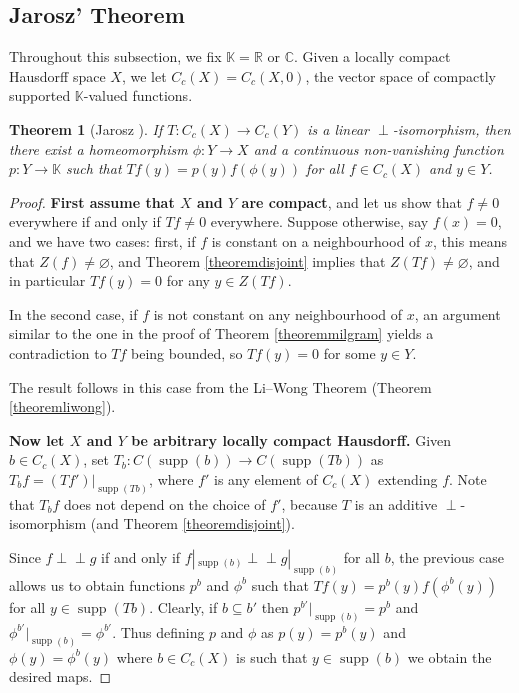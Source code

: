 \documentclass[letter,11pt]{amsart}
\theoremstyle{plain}		\newtheorem{theorem}[generalnumbering]{Theorem}
\theoremstyle{plain}		\newtheorem{corollary}[generalnumbering]{Corollary}
\theoremstyle{definition}		\newtheorem{definition}[generalnumbering]{Definition}
\theoremstyle{definition}		\newtheorem{example}[generalnumbering]{Example}
\theoremstyle{plain}		\newtheorem{proposition}[generalnumbering]{Proposition}
\theoremstyle{plain}		\newtheorem{lemma}[generalnumbering]{Lemma}
\theoremstyle{plain}    \newtheorem{plainstyle}[generalnumbering]{\namefordifferentenvironment}
\theoremstyle{plain}    \newtheorem*{plainstyle*}{\namefordifferentenvironment}
\theoremstyle{definition}    \newtheorem{definitionstyle}[generalnumbering]{\namefordifferentenvironment}
\theoremstyle{definition}    \newtheorem*{definitionstyle*}{\namefordifferentenvironment}
\newcommand{\perpp}{\perp\!\!\!\perp}
\DeclareMathOperator{\supp}{supp}
\begin{document}

\subsection{Jarosz' Theorem}\label{subsectionjarosz}

Throughout this subsection, we fix $\mathbb{K}=\mathbb{R}$ or $\mathbb{C}$. Given a locally compact Hausdorff space $X$, we let $C_c(X)=C_c(X,0)$, the vector space of compactly supported $\mathbb{K}$-valued functions.

\begin{theorem}[Jarosz \cite{MR1060366}]\label{theoremjarosz}
	If $T\colon C_c(X)\to C_c(Y)$ is a linear $\perp$-isomorphism, then there exist a homeomorphism $\phi\colon Y\to X$ and a continuous non-vanishing function $p\colon Y\to\mathbb{K}$ such that $Tf(y)=p(y)f(\phi(y))$ for all $f\in C_c(X)$ and $y\in Y$.
\end{theorem}
\begin{proof}
	\textbf{First assume that $X$ and $Y$ are compact}, and let us show that $f\neq 0$ everywhere if and only if $Tf\neq 0$ everywhere. Suppose otherwise, say $f(x)=0$, and we have two cases: first, if $f$ is constant on a neighbourhood of $x$, this means that $Z(f)\neq \varnothing$, and Theorem \ref{theoremdisjoint} implies that $Z(Tf)\neq \varnothing$, and in particular $Tf(y)=0$ for any $y\in Z(Tf)$.
	
	In the second case, if $f$ is not constant on any neighbourhood of $x$, an argument similar to the one in the proof of Theorem \ref{theoremmilgram} yields a contradiction to $Tf$ being bounded, so $Tf(y)=0$ for some $y\in Y$.
	
	The result follows in this case from the Li--Wong Theorem (Theorem \ref{theoremliwong}).
	
	\textbf{Now let $X$ and $Y$ be arbitrary locally compact Hausdorff.} Given $b\in C_c(X)$, set $T_b\colon C(\supp(b))\to C(\supp(Tb))$ as $T_bf=(Tf')|_{\supp(Tb)}$, where $f'$ is any element of $C_c(X)$ extending $f$. Note that $T_bf$ does not depend on the choice of $f'$, because $T$ is an additive $\perp$-isomorphism (and Theorem \ref{theoremdisjoint}).
	
	Since $f\perpp g$ if and only if $f|_{\supp(b)}\perpp g|_{\supp(b)}$ for all $b$, the previous case allows us to obtain functions $p^b$ and $\phi^b$ such that $Tf(y)=p^b(y)f(\phi^b(y))$ for all $y\in\supp(Tb)$. Clearly, if $b\subseteq b'$ then $p^{b'}|_{\supp(b)}=p^b$ and $\phi^{b'}|_{\supp(b)}=\phi^{b'}$. Thus defining $p$ and $\phi$ as $p(y)=p^b(y)$ and $\phi(y)=\phi^b(y)$ where $b\in C_c(X)$ is such that $y\in\supp(b)$ we obtain the desired maps.\qedhere
\end{proof}
\end{document}

